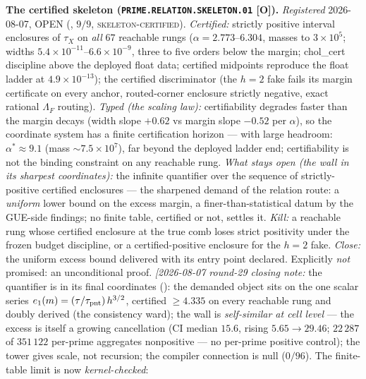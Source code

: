 \par\smallskip\noindent\textbf{The certified skeleton
(\texttt{PRIME.RELATION.SKELETON.01} [O]).}
{\sloppy
\emph{Registered} 2026-08-07, OPEN
(, $9/9$,
\textsc{skeleton-certified}).  \emph{Certified:} strictly
positive interval enclosures of $\tau_X$ on \emph{all} $67$
reachable rungs ($\alpha = 2.773$--$6.304$, masses to
$3\times10^5$; widths $5.4\times10^{-11}$--$6.6\times10^{-9}$,
three to five orders below the margin; chol\_cert discipline
above the deployed float data; certified midpoints reproduce the
float ladder at $4.9\times10^{-13}$); the certified discriminator
(the $h = 2$ fake fails its margin certificate on every anchor,
routed-corner enclosure strictly negative, exact rational
$\Lambda_F$ routing).  \emph{Typed (the scaling law):}
certifiability degrades faster than the margin decays (width
slope $+0.62$ vs margin slope $-0.52$ per $\alpha$), so the
coordinate system has a finite certification horizon --- with
large headroom: $\alpha^* \approx 9.1$ (mass
$\sim 7.5\times10^7$), far beyond the deployed ladder end;
certifiability is not the binding constraint on any reachable
rung.  \emph{What stays open (the wall in its sharpest
coordinates):} the infinite quantifier over the sequence of
strictly-positive certified enclosures --- the sharpened demand
of the relation route: a \emph{uniform} lower bound on the excess
margin, a finer-than-statistical datum by the GUE-side findings;
no finite table, certified or not, settles it.  \emph{Kill:} a
reachable rung whose certified enclosure at the true comb loses
strict positivity under the frozen budget discipline, or a
certified-positive enclosure for the $h = 2$ fake.  \emph{Close:}
the uniform excess bound delivered with its entry point declared.
Explicitly \emph{not} promised: an unconditional proof.
\emph{[2026-08-07 round-29 closing note:} the quantifier is in
its final coordinates
(): the demanded object
sits on the one scalar series $e_1(m) =
(\tau/\tau_{\rm pnt})\,h^{3/2}$, certified $\ge 4.335$ on every
reachable rung and doubly derived (the consistency ward); the
wall is \emph{self-similar at cell level} --- the excess is
itself a growing cancellation (CI median $15.6$, rising
$5.65 \to 29.46$; $22\,287$ of $351\,122$ per-prime aggregates
nonpositive --- no per-prime positive control); the tower gives
scale, not recursion; the compiler connection is null ($0/96$).
The finite-table limit is now \emph{kernel-checked}:
}
